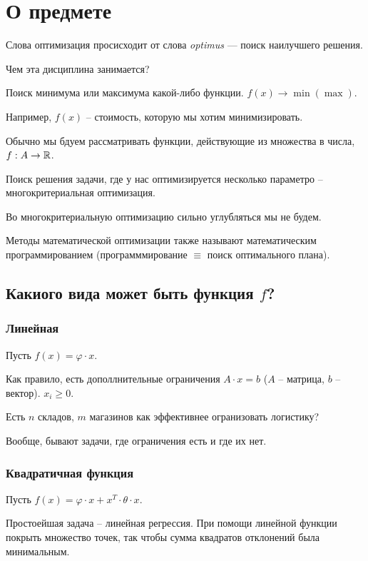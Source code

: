 \chapter{О предмете}

Слова оптимизация просисходит от слова \textit{optimus} --- поиск наилучшего решения.

Чем эта дисциплина занимается?

Поиск минимума или максимума какой-либо функции.
$f(x) \to \min (\max)$.

Например, $f(x)$ -- стоимость, которую мы хотим минимизировать.

Обычно мы бдуем рассматривать функции, действующие из множества в числа, $f: A \to \mathbb{R}$.

Поиск решения задачи, где у нас оптимизируется несколько параметро -- многокритериальная оптимизация.

Во многокритериальную оптимизацию сильно углубляться мы не будем.

Методы математической оптимизации также называют математическим программированием (программмирование $\equiv$ поиск оптимального плана).


\section{Какиого вида может быть функция $f$?}

\subsection{Линейная}
Пусть $f(x) = \varphi \cdot x$.

Как правило, есть дополлнительные ограничения $A \cdot x = b$ ($A$ -- матрица, $b$ -- вектор).
$x_i \geqslant 0$.

\begin{example}
    Есть $n$ складов, $m$ магазинов как эффективнее огранизовать логистику?
\end{example}

Вообще, бывают задачи, где ограничения есть и где их нет.

\subsection{Квадратичная функция}
Пусть $f(x) = \varphi \cdot x + x^T \cdot \theta \cdot x$.

Простоейшая задача -- линейная регрессия.
При помощи линейной функции покрыть множество точек, так чтобы сумма квадратов отклонений была минимальным.

